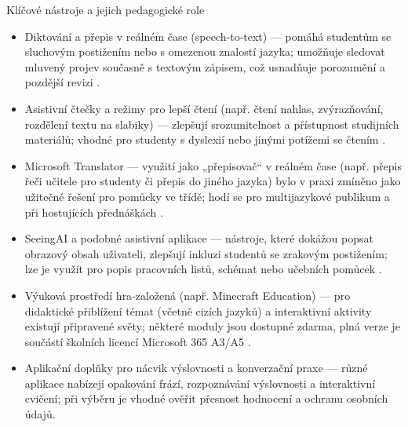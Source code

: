 \documentclass{report}%
\begin{document}
Klíčové nástroje a jejich pedagogické role
\begin{itemize}
  \item Diktování a přepis v reálném čase (speech‑to‑text) — pomáhá studentům se sluchovým postižením nebo s omezenou znalostí jazyka; umožňuje sledovat mluvený projev současně s textovým zápisem, což usnadňuje porozumění a pozdější revizi \cite{kb_ai_101_tipu_pdf_04e4a115_page_11_1}.
  \item Asistivní čtečky a režimy pro lepší čtení (např. čtení nahlas, zvýrazňování, rozdělení textu na slabiky) — zlepšují srozumitelnost a přístupnost studijních materiálů; vhodné pro studenty s dyslexií nebo jinými potížemi se čtením \cite{kb_ai_101_tipu_pdf_04e4a115_page_11_1}.
  \item Microsoft Translator — využití jako „přepisovač“ v reálném čase (např. přepis řeči učitele pro studenty či přepis do jiného jazyka) bylo v praxi zmíněno jako užitečné řešení pro pomůcky ve třídě; hodí se pro multijazykové publikum a při hostujících přednáškách \cite{kb_ai_101_tipu_pdf_04e4a115_page_11_1}.
  \item SeeingAI a podobné asistivní aplikace — nástroje, které dokážou popsat obrazový obsah uživateli, zlepšují inkluzi studentů se zrakovým postižením; lze je využít pro popis pracovních listů, schémat nebo učebních pomůcek \cite{kb_ai_101_tipu_pdf_04e4a115_page_11_1}.
  \item Výuková prostředí hra‑založená (např. Minecraft Education) — pro didaktické přiblížení témat (včetně cizích jazyků) a interaktivní aktivity existují připravené světy; některé moduly jsou dostupné zdarma, plná verze je součástí školních licencí Microsoft 365 A3/A5 \cite{kb_ai_101_tipu_pdf_04e4a115_page_15_2}.
  \item Aplikační doplňky pro nácvik výslovnosti a konverzační praxe — různé aplikace nabízejí opakování frází, rozpoznávání výslovnosti a interaktivní cvičení; při výběru je vhodné ověřit přesnost hodnocení a ochranu osobních údajů.
\end{itemize}
\end{document}
